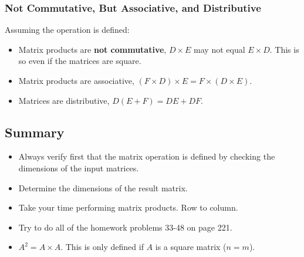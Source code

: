 \documentclass[14pt]{extarticle}
\begin{document}
\subsubsection*{Not Commutative,  But Associative, and Distributive}
Assuming the operation is defined:
\begin{itemize}
	\item Matrix products are \textbf{not commutative}, $D\times E$ may not equal $E\times D$. This is so even if the matrices are square.
	\item Matrix products are associative, $(F\times D) \times E = F\times (D\times E)$.
	\item Matrices are distributive, $D(E+F) = DE + DF$.
\end{itemize}

\subsection{Summary}
\begin{itemize}
	\item Always verify first that the matrix operation is defined by checking the dimensions of the input matrices.
	\item Determine the dimensions of the result matrix.
	\item Take your time performing matrix products. Row to column.
	\item Try to do all of the homework problems 33-48 on page 221.	
	\item $A^2=A\times A$. This is only defined if $A$ is a square matrix ($n=m$).
\end{itemize}
\end{document}
